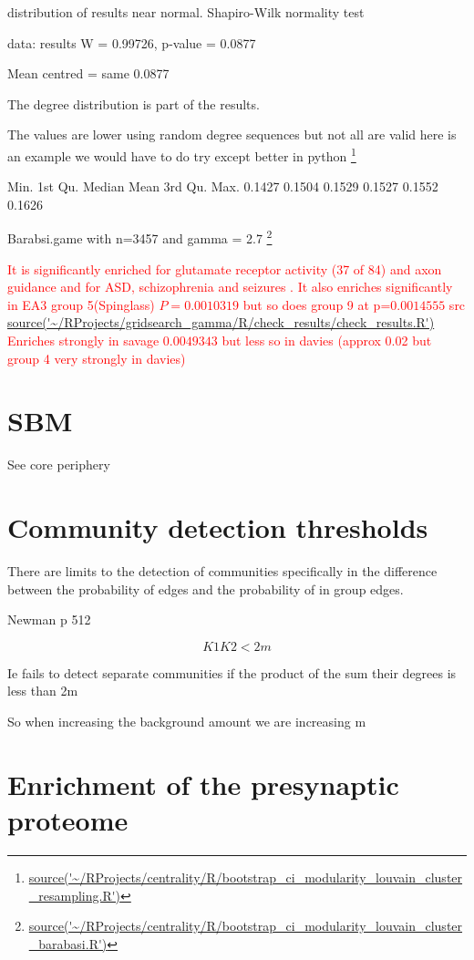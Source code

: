  distribution of results near normal. 	Shapiro-Wilk normality test

data:  results
W = 0.99726, p-value = 0.0877

Mean centred = same 0.0877

The degree distribution is part of the results. 

The values are lower using random degree sequences but not all are valid here is an example we would have to do try except better in python \footnote{\url{source('~/RProjects/centrality/R/bootstrap_ci_modularity_louvain_cluster_resampling.R')}}

   Min. 1st Qu.  Median    Mean 3rd Qu.    Max. 
 0.1427  0.1504  0.1529  0.1527  0.1552  0.1626 
 
 Barabsi.game with n=3457 and gamma = 2.7
 \footnote{\url{source('~/RProjects/centrality/R/bootstrap_ci_modularity_louvain_cluster_barabasi.R')}}
 

\textcolor{red}{It is significantly enriched for glutamate receptor activity (37 of 84) and axon guidance and for ASD, schizophrenia and seizures . It also enriches significantly in EA3 group 5(Spinglass) $P=0.0010319$ but so does group 9 at p=$0.0014555$ src \url{source('~/RProjects/gridsearch_gamma/R/check_results/check_results.R')}
Enriches strongly in savage $0.0049343$ but less so in davies (approx 0.02 but group 4 very strongly in davies)}

\section{SBM}
See core periphery

 \section{Community detection thresholds}
There are limits to the detection of communities specifically in the difference between the probability of edges and the probability of in group edges.

Newman p 512

\begin{equation}
    K1K2 < 2m
\end{equation}

Ie fails to detect separate communities if the product of the sum their degrees is less than 2m

So when increasing the background amount we are increasing m

 
 \section{Enrichment of the presynaptic proteome}
 
